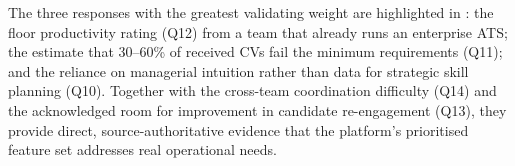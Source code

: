 The three responses with the greatest validating weight are highlighted in
: the floor productivity rating (Q12) from a
team that already runs an enterprise ATS; the estimate that 30--60\% of
received CVs fail the minimum requirements (Q11); and the reliance on
managerial intuition rather than data for strategic skill planning (Q10).
Together with the cross-team coordination difficulty (Q14) and the
acknowledged room for improvement in candidate re-engagement (Q13), they
provide direct, source-authoritative evidence that the platform's
prioritised feature set addresses real operational needs.
